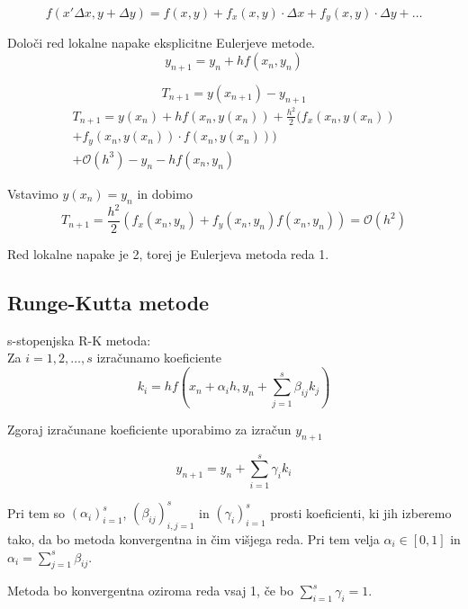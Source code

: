 \documentclass[a4paper,12pt]{article}
\theoremstyle{definition}
\theoremstyle{remark}
\begin{document}
\begin{equation*}
    f(x ' \Delta x, y + \Delta y) = f(x, y) + f_x(x, y) \cdot \Delta x + f_y(x,y) \cdot \Delta y + \dots
\end{equation*}

Določi red lokalne napake eksplicitne Eulerjeve metode.
\begin{equation*}
    y_{n+1} = y_n + h f(x_n, y_n)
\end{equation*}


\begin{equation*}
    T_{n+1} = y(x_{n+1}) - y_{n+1}
\end{equation*}
\begin{multline*}
    T_{n+1} = y(x_n) + h f(x_n, y(x_n)) + \frac{h^2}{2} (f_x(x_n, y(x_n)) \\
    + f_y(x_n, y(x_n)) \cdot f(x_n, y(x_n))) \\
    + \mathcal{O}(h^3) - y_n - h f(x_n, y_n)
\end{multline*}

Vstavimo $y(x_n) = y_n$ in dobimo
\begin{equation*}
    T_{n+1} = \frac{h^2}{2} (f_x(x_n, y_n) + f_y(x_n, y_n)f(x_n, y_n)) = \mathcal{O}(h^2)
\end{equation*}

Red lokalne napake je 2, torej je Eulerjeva metoda reda 1.

\subsection{Runge-Kutta metode}
s-stopenjska R-K metoda: \\
Za $i = 1, 2, \dots, s$ izračunamo koeficiente
\begin{equation*}
    k_i = h f(x_n + \alpha_i h, y_n + \sum_{j=1}^{s} \beta_{ij} k_j) 
\end{equation*}

Zgoraj izračunane koeficiente uporabimo za izračun $y_{n+1}$

\begin{equation*}
    y_{n+1} = y_n + \sum_{i=1}^{s} \gamma_i k_i 
\end{equation*}

Pri tem so $(\alpha_i)_{i=1}^s$, $(\beta_{ij})_{i, j=1}^s$ in $(\gamma_i)_{i=1}^s$ prosti koeficienti, ki jih izberemo tako,
da bo metoda konvergentna in čim višjega reda. Pri tem velja $\alpha_i \in [0, 1]$ in $\alpha_i = \sum_{j=1}^{s} \beta_{ij}$.

Metoda bo konvergentna oziroma reda vsaj 1, če bo $\sum_{i=1}^{s} \gamma_i = 1$.
\end{document}
